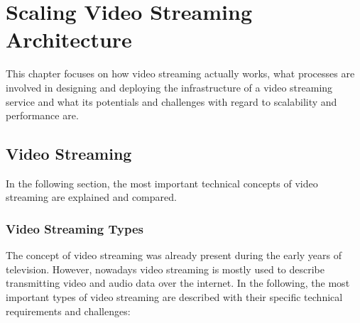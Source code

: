 \chapter{Scaling Video Streaming Architecture}\label{chapter:videostreaming}

This chapter focuses on how video streaming actually works, what processes are involved in designing and deploying the infrastructure of a video streaming service and what its potentials and challenges with regard to scalability and performance are.   

\section{Video Streaming}\label{section:video-streaming}

In the following section, the most important technical concepts of video streaming are explained and compared.

\subsection{Video Streaming Types}\label{subsection:video-streaming-types}
The concept of video streaming was already present during the early years of television. However, nowadays video streaming is mostly used to describe transmitting video and audio data over the internet. In the following, the most important types of video streaming are described with their specific technical requirements and challenges:

